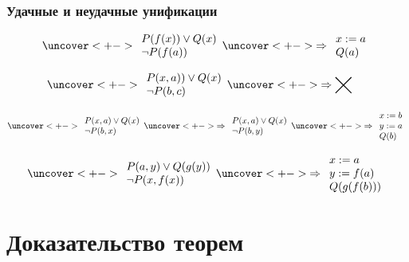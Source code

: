 \documentclass[24pt,pdf,hyperref={unicode},aspectratio=169]{beamer}
\newcommand{\nothing}
{
\begin{minipage}{1cm}
\begin{tikzpicture}[x=0.5cm,y=0.5cm]
\draw[thick] (0,0)--(1,1);
\draw[thick] (0,1)--(1,0);
\end{tikzpicture}
\end{minipage}
}
\begin{document}
\begin{frame}\frametitle{Удачные и неудачные унификации}

$$
\uncover<+->{
\begin{array}{l}
P(f(x))\vee Q(x) \\
\neg P(f(a))
\end{array}
}
\uncover<+->{
\Rightarrow
\begin{array}{l}
x:=a\\
Q(a)
\end{array}
}
$$

$$
\uncover<+->{
\begin{array}{l}
P(x,a))\vee Q(x) \\
\neg P(b,c)
\end{array}
}
\uncover<+->{
\Rightarrow
\nothing
}
$$

$$
\uncover<+->{
\begin{array}{l}
P(x,a)\vee Q(x) \\
\neg P(b,x)
\end{array}
}
\uncover<+->{
\Rightarrow
\begin{array}{l}
P(x,a)\vee Q(x) \\
\neg P(b,y)
\end{array}
}
\uncover<+->{
\Rightarrow
\begin{array}{l}
x:=b\\
y:=a\\
Q(b)\\
\end{array}
}
$$

$$
\uncover<+->{
\begin{array}{l}
P(a,y)\vee Q(g(y)) \\
\neg P(x,f(x))
\end{array}
}
\uncover<+->{
\Rightarrow
\begin{array}{l}
x:=a\\
y:=f(a)\\
Q(g(f(b)))\\
\end{array}
}
$$
\end{frame}

\section{Доказательство теорем}
\end{document}
